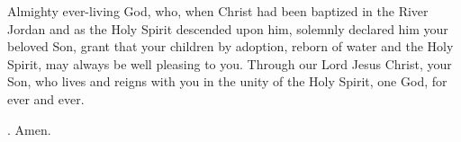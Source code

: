 \lettrine[lines=3]{A}{}lmighty ever-living God,
who, when Christ had been baptized in the River Jordan
and as the Holy Spirit descended upon him,
solemnly declared him your beloved Son,
grant that your children by adoption,
reborn of water and the Holy Spirit,
may always be well pleasing to you.
Through our Lord Jesus Christ, your Son,
who lives and reigns with you in the unity of the Holy Spirit,
one God, for ever and ever.
\par \Rbar. Amen.
